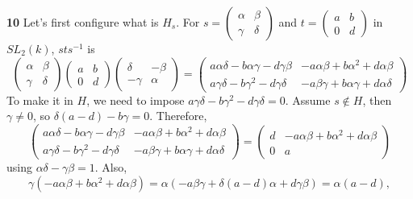 \documentclass[a4paper, 12pt]{article}
\theoremstyle{Mydefinition}
\theoremstyle{Mytheorem}
\begin{document}
\noindent \textbf{10}
    Let's first configure what is $H_s$. For $s = \begin{pmatrix}\alpha & \beta\\ \gamma & \delta
    \end{pmatrix}$ and $t = \begin{pmatrix}
    a & b\\ 0 & d
    \end{pmatrix}$ in $SL_2(k)$, $sts^{-1}$ is
\begin{equation}
    \begin{pmatrix}
    \alpha & \beta\\
    \gamma & \delta
    \end{pmatrix}\begin{pmatrix}
    a & b \\ 0 & d
    \end{pmatrix}\begin{pmatrix}
    \delta & -\beta\\
    -\gamma & \alpha
    \end{pmatrix} = \begin{pmatrix}
    a\alpha\delta - b\alpha\gamma - d\gamma\beta & -a\alpha\beta + b\alpha^2+d\alpha\beta\\
    a\gamma\delta - b\gamma^2 - d\gamma\delta & -a\beta\gamma + b\alpha\gamma + d\alpha\delta
    \end{pmatrix}
\end{equation}
To make it in $H$, we need to impose $a\gamma\delta - b\gamma^2 - d\gamma\delta = 0$. Assume $s\not\in H$, then $\gamma\neq 0$, so $\delta(a-d)-b\gamma = 0$. Therefore,
\begin{equation}
    \begin{pmatrix}
    a\alpha\delta - b\alpha\gamma - d\gamma\beta & -a\alpha\beta + b\alpha^2+d\alpha\beta\\
    a\gamma\delta - b\gamma^2 - d\gamma\delta & -a\beta\gamma + b\alpha\gamma + d\alpha\delta
    \end{pmatrix} = \begin{pmatrix}
    d & -a\alpha\beta + b\alpha^2+d\alpha\beta\\
    0 & a
    \end{pmatrix}
\end{equation}
using $\alpha\delta-\gamma\beta = 1$. Also,
\begin{equation}
    \gamma(-a\alpha\beta + b\alpha^2+d\alpha\beta) = \alpha(-a\beta\gamma + \delta(a-d)\alpha + d\gamma\beta) = \alpha(a-d),
\end{equation}
\end{document}
